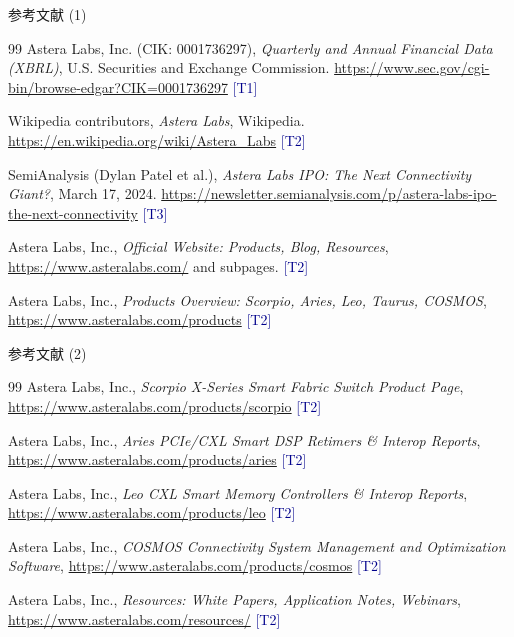 \documentclass[UTF8,11pt,aspectratio=169]{beamer}
\newcommand{\sourceT}[1]{{\small\textcolor{darkblue}{[T#1]}}}
\begin{document}
\begin{frame}{参考文献 (1)}
    \begin{thebibliography}{99}
        Astera Labs, Inc. (CIK: 0001736297),
        \emph{Quarterly and Annual Financial Data (XBRL)},
        U.S. Securities and Exchange Commission.
        \url{https://www.sec.gov/cgi-bin/browse-edgar?CIK=0001736297}
        \sourceT{1}

        Wikipedia contributors,
        \emph{Astera Labs},
        Wikipedia.
        \url{https://en.wikipedia.org/wiki/Astera_Labs}
        \sourceT{2}

        SemiAnalysis (Dylan Patel et al.),
        \emph{Astera Labs IPO: The Next Connectivity Giant?},
        March 17, 2024.
        \url{https://newsletter.semianalysis.com/p/astera-labs-ipo-the-next-connectivity}
        \sourceT{3}

        Astera Labs, Inc.,
        \emph{Official Website: Products, Blog, Resources},
        \url{https://www.asteralabs.com/} and subpages.
        \sourceT{2}

        Astera Labs, Inc.,
        \emph{Products Overview: Scorpio, Aries, Leo, Taurus, COSMOS},
        \url{https://www.asteralabs.com/products}
        \sourceT{2}
    \end{thebibliography}
\end{frame}

\begin{frame}{参考文献 (2)}
    \begin{thebibliography}{99}
        Astera Labs, Inc.,
        \emph{Scorpio X-Series Smart Fabric Switch Product Page},
        \url{https://www.asteralabs.com/products/scorpio}
        \sourceT{2}

        Astera Labs, Inc.,
        \emph{Aries PCIe/CXL Smart DSP Retimers \& Interop Reports},
        \url{https://www.asteralabs.com/products/aries}
        \sourceT{2}

        Astera Labs, Inc.,
        \emph{Leo CXL Smart Memory Controllers \& Interop Reports},
        \url{https://www.asteralabs.com/products/leo}
        \sourceT{2}

        Astera Labs, Inc.,
        \emph{COSMOS Connectivity System Management and Optimization Software},
        \url{https://www.asteralabs.com/products/cosmos}
        \sourceT{2}

        Astera Labs, Inc.,
        \emph{Resources: White Papers, Application Notes, Webinars},
        \url{https://www.asteralabs.com/resources/}
        \sourceT{2}
    \end{thebibliography}
\end{frame}
\end{document}
